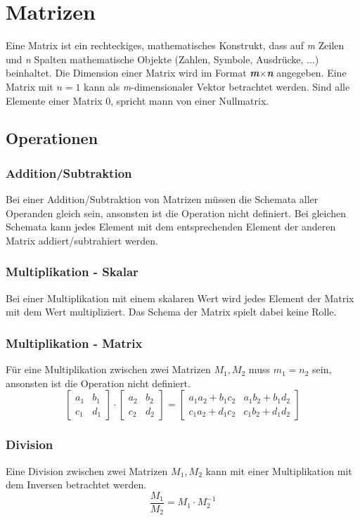 \documentclass{article}
\author{Philipp Kiss}
\begin{document}
\section{Matrizen}
Eine Matrix ist ein rechteckiges, mathematisches Konstrukt, dass auf \textit{m} Zeilen und \textit{n} Spalten mathematische Objekte (Zahlen, Symbole, Ausdrücke, ...) beinhaltet. Die Dimension einer Matrix wird im Format \textbf{\textit{m}$\times$\textit{n}} angegeben. Eine Matrix mit $n = 1$ kann als \textit{m}-dimensionaler Vektor betrachtet werden. Sind alle Elemente einer Matrix 0, spricht mann von einer Nullmatrix.
\subsection{Operationen}
\subsubsection{Addition/Subtraktion}
Bei einer Addition/Subtraktion von Matrizen müssen die Schemata aller Operanden gleich sein, ansonsten ist die Operation nicht definiert. Bei gleichen Schemata kann jedes Element mit dem entsprechenden Element der anderen Matrix addiert/subtrahiert werden.
\subsubsection{Multiplikation - Skalar}
Bei einer Multiplikation mit einem skalaren Wert wird jedes Element der Matrix mit dem Wert multipliziert. Das Schema der Matrix spielt dabei keine Rolle.
\subsubsection{Multiplikation - Matrix}
Für eine Multiplikation zwischen zwei Matrizen $M_1, M_2$ muss $m_1 = n_2$ sein, ansonsten ist die Operation nicht definiert.
$$
\begin{bmatrix}
a_1 & b_1\\
c_1 & d_1
\end{bmatrix}
\cdot
\begin{bmatrix}
a_2 & b_2 \\
c_2 & d_2
\end{bmatrix}
= 
\begin{bmatrix}
a_1 a_2 + b_1	c_2 & a_1 b_2 + b_1 d_2 \\
c_1 a_2 + d_1 c_2 & c_1	b_2 + d_1 d_2
\end{bmatrix}
$$
\subsubsection{Division}
Eine Division zwischen zwei Matrizen $M_1, M_2$ kann mit einer Multiplikation mit dem Inversen betrachtet werden.
$$ \frac{M_1}{M_2} = M_1 \cdot M_2^{-1}$$
\end{document}
